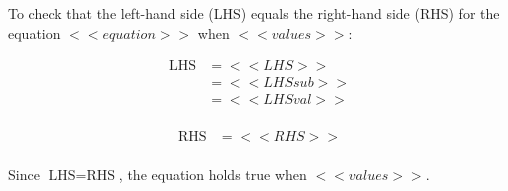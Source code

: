 To check that the left-hand side (LHS) equals the right-hand side (RHS) for the equation \( <<equation>> \) when \( <<values>> \):

\begin{multicols}{2}
\noindent
\begin{align*}
\text{LHS} &= <<LHS>> \\
           &= <<LHSsub>> \\
           &= <<LHSval>> \\
\end{align*}

\columnbreak

\noindent
\begin{align*}
\text{RHS} &= <<RHS>> \\
\end{align*}
\end{multicols}

Since \(\text{LHS} = \text{RHS}\), the equation holds true when \( <<values>> \).
